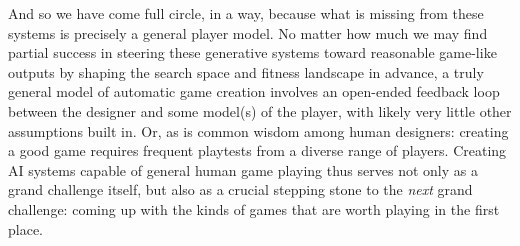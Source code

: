 \documentclass[runningheads]{llncs}
\begin{document}
And so we have come full circle, in a way, because what is missing from these systems is precisely a general player model. No matter how much we may find partial success in steering these generative systems toward reasonable game-like outputs by shaping the search space and fitness landscape in advance, a truly general model of automatic game creation involves an open-ended feedback loop between the designer and some model(s) of the player, with likely very little other assumptions built in.
Or, as is common wisdom among human designers: creating a good game requires frequent playtests from a diverse range of players. Creating AI systems capable of general human game playing thus serves not only as a grand challenge itself, but also as a crucial stepping stone to the \textit{next} grand challenge: coming up with the kinds of games that are worth playing in the first place.




\end{document}
